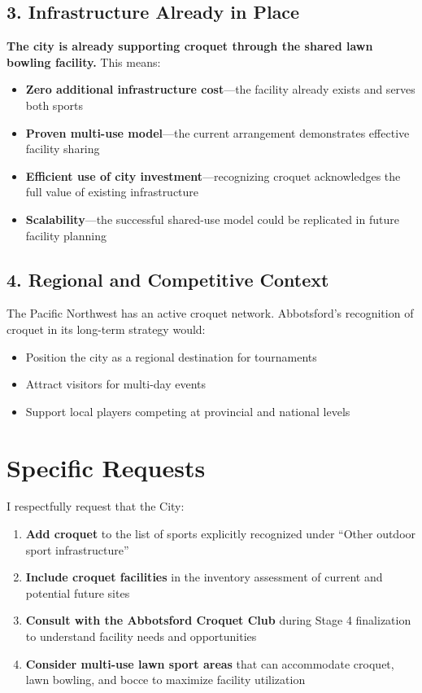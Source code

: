 \documentclass[11pt,letterpaper]{article}
\begin{document}
\subsection*{3. Infrastructure Already in Place}
\textbf{The city is already supporting croquet through the shared lawn bowling facility.} This means:
\begin{itemize}[leftmargin=*]
    \item \textbf{Zero additional infrastructure cost}---the facility already exists and serves both sports
    \item \textbf{Proven multi-use model}---the current arrangement demonstrates effective facility sharing
    \item \textbf{Efficient use of city investment}---recognizing croquet acknowledges the full value of existing infrastructure
    \item \textbf{Scalability}---the successful shared-use model could be replicated in future facility planning
\end{itemize}

\subsection*{4. Regional and Competitive Context}
The Pacific Northwest has an active croquet network. Abbotsford's recognition of croquet in its long-term strategy would:
\begin{itemize}[leftmargin=*]
    \item Position the city as a regional destination for tournaments
    \item Attract visitors for multi-day events
    \item Support local players competing at provincial and national levels
\end{itemize}

\section*{Specific Requests}

I respectfully request that the City:

\begin{enumerate}[leftmargin=*]
    \item \textbf{Add croquet} to the list of sports explicitly recognized under ``Other outdoor sport infrastructure''
    \item \textbf{Include croquet facilities} in the inventory assessment of current and potential future sites
    \item \textbf{Consult with the Abbotsford Croquet Club} during Stage 4 finalization to understand facility needs and opportunities
    \item \textbf{Consider multi-use lawn sport areas} that can accommodate croquet, lawn bowling, and bocce to maximize facility utilization
\end{enumerate}
\end{document}
